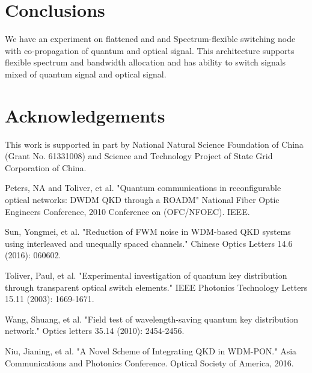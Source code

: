 \documentclass[letterpaper,10pt]{article}
\begin{document}
\section{Conclusions}
We have an experiment on flattened and  and Spectrum-flexible switching node with co-propagation of quantum and optical signal. This architecture supports flexible spectrum and bandwidth allocation and has ability to switch signals mixed of quantum signal and optical signal.

\section{Acknowledgements}
This work is supported in part by National Natural Science Foundation of China (Grant No. 61331008) and Science and Technology Project of State Grid Corporation of China.



\begin{thebibliography}{99}

 Peters, NA and Toliver, et al. "Quantum communications in reconfigurable optical networks: DWDM QKD through a ROADM" National Fiber Optic Engineers Conference, 2010 Conference on (OFC/NFOEC). IEEE.

 Sun, Yongmei, et al. "Reduction of FWM noise in WDM-based QKD systems using interleaved and unequally spaced channels." Chinese Optics Letters 14.6 (2016): 060602.

 Toliver, Paul, et al. "Experimental investigation of quantum key distribution through transparent optical switch elements." IEEE Photonics Technology Letters 15.11 (2003): 1669-1671.

 Wang, Shuang, et al. "Field test of wavelength-saving quantum key distribution network." Optics letters 35.14 (2010): 2454-2456.

 Niu, Jianing, et al. "A Novel Scheme of Integrating QKD in WDM-PON." Asia Communications and Photonics Conference. Optical Society of America, 2016.

\end{thebibliography}
\end{document}
